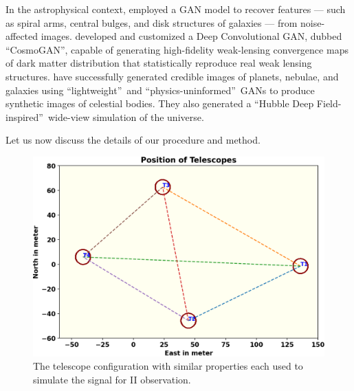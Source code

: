 In the astrophysical context, \cite{schawinski2017galaxypics} employed a GAN model to recover features — such as spiral arms, central bulges, and disk structures of galaxies — from noise-affected images. \cite{mustafa2019cosmogan} developed and customized a Deep Convolutional GAN, dubbed \textquotedblleft CosmoGAN\textquotedblright, capable of generating high-fidelity weak-lensing convergence maps of dark matter distribution that statistically reproduce real weak lensing structures. \cite{coccomini2021lightweightgan} have successfully generated credible images of planets, nebulae, and galaxies using \textquotedblleft lightweight\textquotedblright\ and \textquotedblleft physics-uninformed\textquotedblright\ GANs to produce synthetic images of celestial bodies. They also generated a \textquotedblleft Hubble Deep Field-inspired\textquotedblright\ wide-view simulation of the universe. 

Let us now discuss the details of our procedure and method. 

\begin{figure}
	\centering
	\includegraphics[width=\linewidth]{fig/telescope.png}
	\caption{The telescope configuration with similar properties each used to simulate the signal for II observation.}
	\label{fig:teles}
\end{figure}